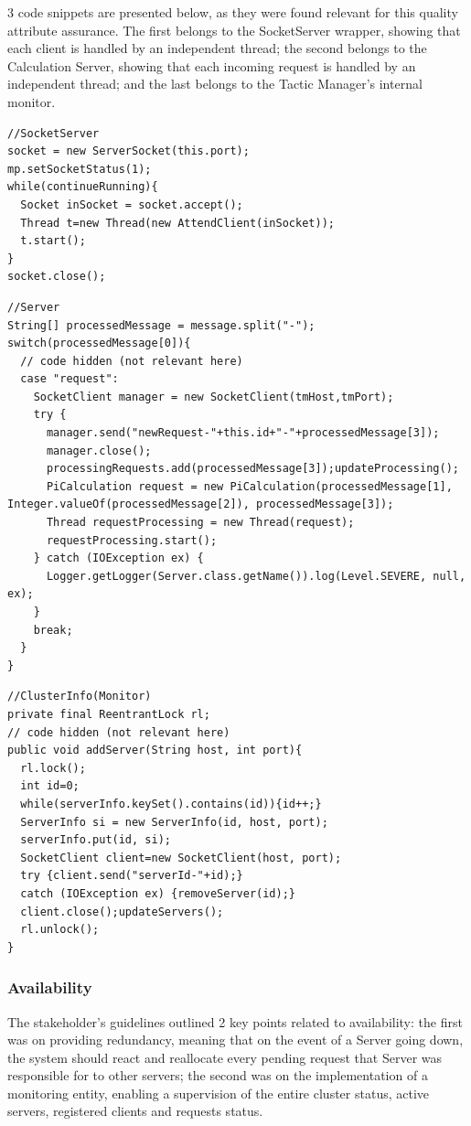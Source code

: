 \documentclass[12pt]{article}
\begin{document}
3 code snippets are presented below, as they were found relevant for this quality attribute assurance.
The first belongs to the SocketServer wrapper, showing that each client is handled by an independent thread;
the second belongs to the Calculation Server, showing that each incoming request is handled by an independent thread;
and the last belongs to the Tactic Manager's internal monitor.

\begin{lstlisting}
//SocketServer
socket = new ServerSocket(this.port);
mp.setSocketStatus(1);
while(continueRunning){
  Socket inSocket = socket.accept();
  Thread t=new Thread(new AttendClient(inSocket));
  t.start();
}
socket.close();
\end{lstlisting}

\begin{lstlisting}
//Server
String[] processedMessage = message.split("-");
switch(processedMessage[0]){
  // code hidden (not relevant here)
  case "request":
    SocketClient manager = new SocketClient(tmHost,tmPort);
    try {
      manager.send("newRequest-"+this.id+"-"+processedMessage[3]);
      manager.close();
      processingRequests.add(processedMessage[3]);updateProcessing();
      PiCalculation request = new PiCalculation(processedMessage[1], Integer.valueOf(processedMessage[2]), processedMessage[3]);
      Thread requestProcessing = new Thread(request);
      requestProcessing.start();
    } catch (IOException ex) {
      Logger.getLogger(Server.class.getName()).log(Level.SEVERE, null, ex);
    }
    break;
  }
}
\end{lstlisting}

\begin{lstlisting}
//ClusterInfo(Monitor)
private final ReentrantLock rl;
// code hidden (not relevant here)
public void addServer(String host, int port){
  rl.lock();
  int id=0;
  while(serverInfo.keySet().contains(id)){id++;}
  ServerInfo si = new ServerInfo(id, host, port);
  serverInfo.put(id, si);
  SocketClient client=new SocketClient(host, port);
  try {client.send("serverId-"+id);} 
  catch (IOException ex) {removeServer(id);}
  client.close();updateServers();
  rl.unlock();
}
\end{lstlisting}

\subsubsection{Availability} \label{availability}

The stakeholder's guidelines outlined 2 key points related to availability:
the first was on providing redundancy, meaning that on the event of a Server going down, the system should react and reallocate every pending request that Server
was responsible for to other servers;
the second was on the implementation of a monitoring entity, enabling a supervision of the entire cluster status, active servers, registered clients and requests status.
\end{document}
